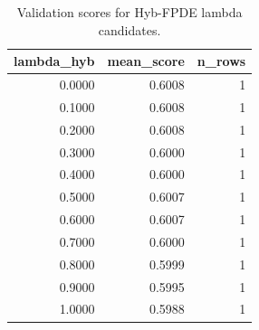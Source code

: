 \begin{table}[t]
\caption{Validation scores for Hyb-FPDE lambda candidates.}
\label{tab:lambda_distribution_computed}
\centering
\begin{tabular}{rrr}
\toprule
lambda\_hyb & mean\_score & n\_rows \\
\midrule
0.0000 & 0.6008 & 1 \\
0.1000 & 0.6008 & 1 \\
0.2000 & 0.6008 & 1 \\
0.3000 & 0.6000 & 1 \\
0.4000 & 0.6000 & 1 \\
0.5000 & 0.6007 & 1 \\
0.6000 & 0.6007 & 1 \\
0.7000 & 0.6000 & 1 \\
0.8000 & 0.5999 & 1 \\
0.9000 & 0.5995 & 1 \\
1.0000 & 0.5988 & 1 \\
\bottomrule
\end{tabular}

\end{table}
